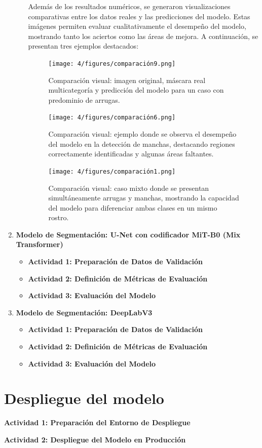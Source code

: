 \begin{enumerate}
\begin{itemize}
\vspace{0.5cm}

Además de los resultados numéricos, se generaron visualizaciones comparativas entre los datos reales y las predicciones del modelo. Estas imágenes permiten evaluar cualitativamente el desempeño del modelo, mostrando tanto los aciertos como las áreas de mejora. A continuación, se presentan tres ejemplos destacados:

\vspace{0.5cm}

\begin{figure}[H]
\centering
\texttt{[image: 4/figures/comparación9.png]}
\caption{Comparación visual: imagen original, máscara real multicategoría y predicción del modelo para un caso con predominio de arrugas.}
\label{fig:validacion1}
\end{figure}

\begin{figure}[H]
\centering
\texttt{[image: 4/figures/comparación6.png]}
\caption{Comparación visual: ejemplo donde se observa el desempeño del modelo en la detección de manchas, destacando regiones correctamente identificadas y algunas áreas faltantes.}
\label{fig:validacion2}
\end{figure}

\begin{figure}[H]
\centering
\texttt{[image: 4/figures/comparación1.png]}
\caption{Comparación visual: caso mixto donde se presentan simultáneamente arrugas y manchas, mostrando la capacidad del modelo para diferenciar ambas clases en un mismo rostro.}
\label{fig:validacion3}
\end{figure}

  \end{itemize}


  \item \textbf{Modelo de Segmentación: U-Net con codificador MiT-B0 (Mix Transformer)}
  \begin{itemize}
  \item\textbf{Actividad 1: Preparación de Datos de Validación}
  \item\textbf{Actividad 2: Definición de Métricas de Evaluación}
  \item\textbf{Actividad 3: Evaluación del Modelo}
  \end{itemize}


\item \textbf{Modelo de Segmentación: DeepLabV3}
  \begin{itemize}
  \item\textbf{Actividad 1: Preparación de Datos de Validación}
  \item\textbf{Actividad 2: Definición de Métricas de Evaluación}
  \item\textbf{Actividad 3: Evaluación del Modelo}
  \end{itemize}
\end{enumerate}






\section{Despliegue del modelo}
\textbf{Actividad 1: Preparación del Entorno de Despliegue}

\textbf{Actividad 2: Despliegue del Modelo en Producción}
